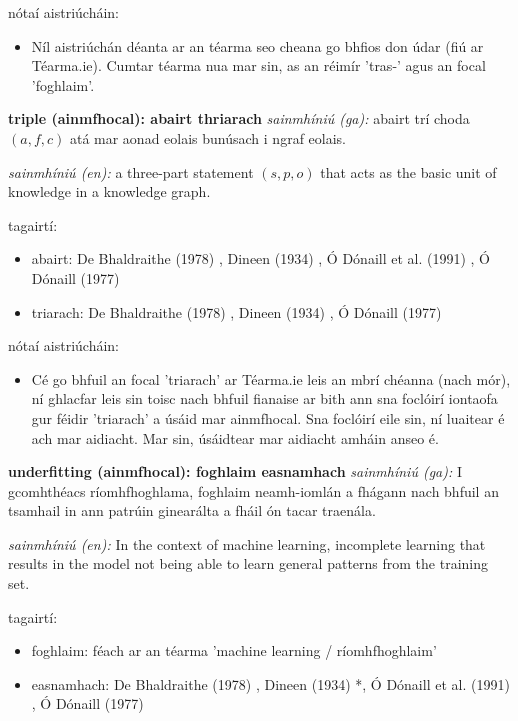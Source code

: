 \documentclass{article}
\begin{document}
nótaí aistriúcháin:
\begin{itemize}
	\item Níl aistriúchán déanta ar an téarma seo cheana go bhfios don údar (fiú ar Téarma.ie). Cumtar téarma nua mar sin, as an réimír 'tras-' agus an focal 'foghlaim'.
\end{itemize}


\textbf{triple (ainmfhocal): abairt thriarach}
\textit{sainmhíniú (ga):} abairt trí choda $(a,f,c)$ atá mar aonad eolais bunúsach i ngraf eolais.

\textit{sainmhíniú (en):} a three-part statement $(s,p,o)$ that acts as the basic unit of knowledge in a knowledge graph.

tagairtí:
\begin{itemize}
	\item abairt: De Bhaldraithe (1978) \cite{de-bhaldraithe}, Dineen (1934) \cite{dineen}, Ó Dónaill et al. (1991) \cite{focloir-beag}, Ó Dónaill (1977) \cite{odonaill}
	\item triarach: De Bhaldraithe (1978) \cite{de-bhaldraithe}, Dineen (1934) \cite{dineen}, Ó Dónaill (1977) \cite{odonaill}
\end{itemize}

nótaí aistriúcháin:
\begin{itemize}
	\item Cé go bhfuil an focal 'triarach' ar Téarma.ie leis an mbrí chéanna (nach mór), ní ghlacfar leis sin toisc nach bhfuil fianaise ar bith ann sna foclóirí iontaofa gur féidir 'triarach' a úsáid mar ainmfhocal. Sna foclóirí eile sin, ní luaitear é ach mar aidiacht. Mar sin, úsáidtear mar aidiacht amháin anseo é.
\end{itemize}


\textbf{underfitting (ainmfhocal): foghlaim easnamhach}
\textit{sainmhíniú (ga):} I gcomhthéacs ríomhfhoghlama, foghlaim neamh-iomlán a fhágann nach bhfuil an tsamhail in ann patrúin ginearálta a fháil ón tacar traenála.

\textit{sainmhíniú (en):} In the context of machine learning, incomplete learning that results in the model not being able to learn general patterns from the training set.

tagairtí:
\begin{itemize}
	\item foghlaim: féach ar an téarma 'machine learning / ríomhfhoghlaim'
	\item easnamhach: De Bhaldraithe (1978) \cite{de-bhaldraithe}, Dineen (1934) \cite{dineen}*, Ó Dónaill et al. (1991) \cite{focloir-beag}, Ó Dónaill (1977) \cite{odonaill}
\end{itemize}
\end{document}
